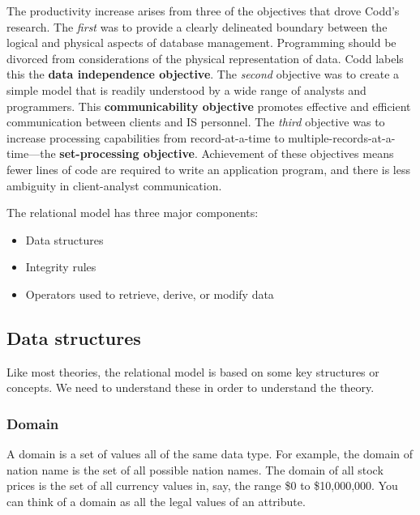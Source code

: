 \documentclass[
]{article}
\begin{document}
The productivity increase arises from three of the objectives that drove
Codd's research. The \emph{first} was to provide a clearly delineated
boundary between the logical and physical aspects of database
management. Programming should be divorced from considerations of the
physical representation of data. Codd labels this the \textbf{data
independence objective}. The \emph{second} objective was to create a simple
model that is readily understood by a wide range of analysts and
programmers. This \textbf{communicability objective} promotes effective and
efficient communication between clients and IS personnel. The \emph{third}
objective was to increase processing capabilities from record-at-a-time
to multiple-records-at-a-time---the \textbf{set-processing objective}.
Achievement of these objectives means fewer lines of code are required
to write an application program, and there is less ambiguity in
client-analyst communication.

The relational model has three major components:

\begin{itemize}
\item
  Data structures
\item
  Integrity rules
\item
  Operators used to retrieve, derive, or modify data
\end{itemize}

\hypertarget{data-structures}{%
\subsection*{Data structures}\label{data-structures}}

Like most theories, the relational model is based on some key structures
or concepts. We need to understand these in order to understand the
theory.

\hypertarget{domain}{%
\subsubsection*{Domain}\label{domain}}

A domain is a set of values all of the same data type. For example, the
domain of nation name is the set of all possible nation names. The
domain of all stock prices is the set of all currency values in, say,
the range \$0 to \$10,000,000. You can think of a domain as all the
legal values of an attribute.
\end{document}
